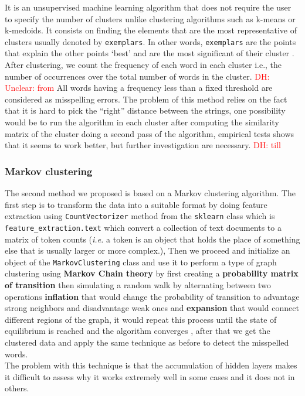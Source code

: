 \documentclass{article}
\newcommand\dhawat[1]{\textcolor{red}{DH: #1}}
\begin{document}
It is an unsupervised machine learning algorithm that does not require the user to specify the number of clusters unlike clustering algorithms such as k-means or k-medoids.
It consists on finding the elements that are the most representative of clusters usually denoted by \texttt{exemplars}.
In other words, \texttt{exemplars} are the points that explain the other points ‘best’ and are the most significant of their cluster \cite{richi}.
After clustering, we count the frequency of each word in each cluster i.e., the number of occurrences over the total number of words in the cluster.
\dhawat{Unclear: from} All words having a frequency less than a fixed threshold are considered as misspelling errors.
The problem of this method relies on the fact that it is hard to pick the ``right'' distance between the strings, one possibility would be to run the algorithm in each cluster after computing the similarity matrix of the cluster doing a second pass of the algorithm, empirical tests shows that it seems to work better, but further investigation are necessary. \dhawat{till}
\subsubsection{Markov clustering}
The second method we proposed is based on a Markov clustering algorithm.
The first step is to transform the data into a suitable format by doing feature extraction using \texttt{CountVectorizer} method from the \texttt{sklearn} class which is \texttt{feature\_extraction.text} \cite{vector} which convert a collection of text documents to a matrix of token counts (\textit{i.e.} a token is an object that holds the place of something else that is usually larger or more complex.), Then we proceed and initialize an object of the \texttt{MarkovClustering} class \cite{MarkovClustering} and use it to perform a type of graph clustering using \textbf{Markov Chain theory} by first creating a \textbf{probability matrix of transition} then simulating a random walk by alternating between two operations \textbf{inflation} that would change the probability of transition to advantage strong neighbors and disadvantage weak ones and \textbf{expansion} that would connect different regions of the graph, it would repeat this process until the state of equilibrium is reached and the algorithm converges \cite{explainMCL}, after that we get the clustered data and apply the same technique as before to detect the misspelled words.\\
The problem with this technique is that the accumulation of hidden layers makes it difficult to assess why it works extremely well in some cases and it does not in others.\\
\end{document}
